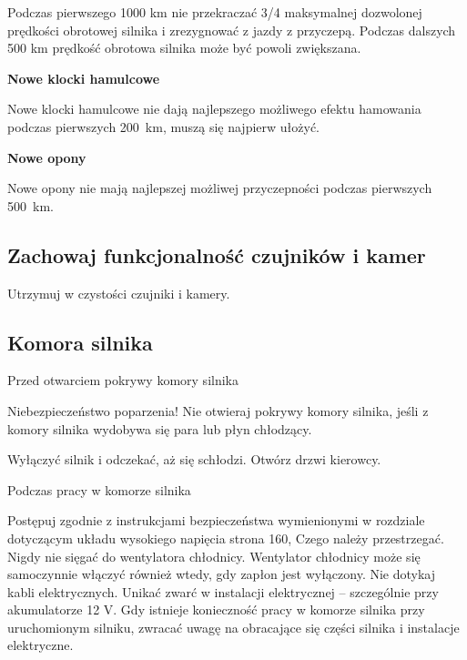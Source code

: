 \begin{itemizeTriangle}
	\itemTriangle Podczas pierwszego 1000 km nie przekraczać 3/4 maksymalnej dozwolonej prędkości obrotowej silnika i zrezygnować z jazdy z przyczepą.
	\itemTriangle Podczas dalszych 500 km prędkość obrotowa silnika może być powoli zwiększana.
\end{itemizeTriangle}

\textbf{Nowe klocki hamulcowe}

Nowe klocki hamulcowe nie dają najlepszego możliwego efektu hamowania podczas pierwszych 200~km, muszą się najpierw ułożyć.

\textbf{Nowe opony}

Nowe opony nie mają najlepszej możliwej przyczepności podczas pierwszych 500~km.

\subsection{Zachowaj funkcjonalność czujników i kamer}

Utrzymuj w czystości czujniki i kamery.

\subsection{Komora silnika}

Przed otwarciem pokrywy komory silnika

Niebezpieczeństwo poparzenia! Nie otwieraj pokrywy komory silnika, jeśli z komory silnika wydobywa się para lub płyn chłodzący.
\begin{itemizeTriangle}
	\itemTriangle Wyłączyć silnik i odczekać, aż się schłodzi.
	\itemTriangle Otwórz drzwi kierowcy.
\end{itemizeTriangle}

Podczas pracy w komorze silnika
\begin{itemizeTriangle}
	\itemTriangle Postępuj zgodnie z instrukcjami bezpieczeństwa wymienionymi w rozdziale dotyczącym układu wysokiego napięcia \guillemotright strona 160, Czego należy przestrzegać.
	\itemTriangle Nigdy nie sięgać do wentylatora chłodnicy. Wentylator chłodnicy może się samoczynnie włączyć również wtedy, gdy zapłon jest wyłączony.
	\itemTriangle Nie dotykaj kabli elektrycznych. Unikać zwarć w instalacji elektrycznej – szczególnie przy akumulatorze 12 V.
	\itemTriangle Gdy istnieje konieczność pracy w komorze silnika przy uruchomionym silniku, zwracać uwagę na obracające się części silnika i instalacje elektryczne.
\end{itemizeTriangle}


